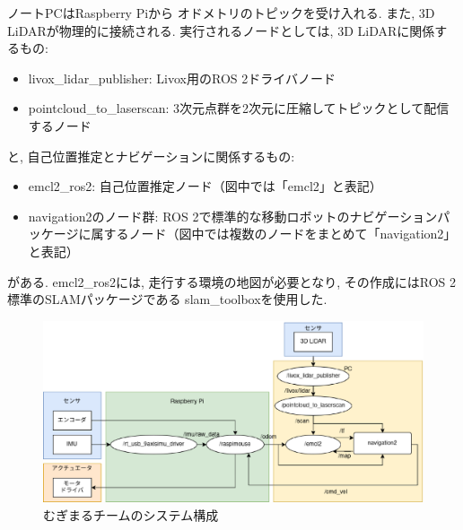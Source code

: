 ノートPCはRaspberry Piから
オドメトリのトピックを受け入れる. 
また, 3D LiDARが物理的に接続される. 
実行されるノードとしては, 3D LiDARに関係するもの: 
\begin{itemize}
	\item livox\_lidar\_publisher: Livox用のROS 2ドライバノード
	\item pointcloud\_to\_laserscan: 3次元点群を2次元に圧縮してトピックとして配信するノード
\end{itemize}
と, 自己位置推定とナビゲーションに関係するもの: 
\begin{itemize}
	\item emcl2\_ros2: 自己位置推定ノード（図中では「emcl2」と表記）
	\item navigation2\cite{nav2}のノード群: ROS 2で標準的な移動ロボットのナビゲーションパッケージに属するノード（図中では複数のノードをまとめて「navigation2」と表記）
\end{itemize}
がある. 
emcl2\_ros2には, 走行する環境の地図が必要となり, 
その作成にはROS 2標準のSLAMパッケージである
slam\_toolbox\cite{slam_toolbox}を使用した. 


\begin{figure}[h]
  \begin{center}
    \includegraphics[width=1.0\linewidth]{figs/mugimaru_system_2024.eps}
    \caption{むぎまるチームのシステム構成}
    \label{fig:mugimaru_system}
  \end{center}
\end{figure}

